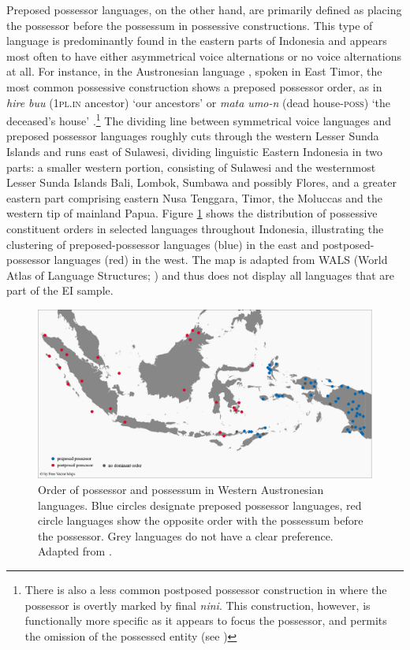 Preposed possessor languages, on the other hand, are primarily defined as placing the possessor before the possessum in possessive constructions. This type of language is predominantly found in the eastern parts of Indonesia and appears most often to have either asymmetrical voice alternations or no voice alternations at all. For instance, in the Austronesian language , spoken in East Timor, the most common possessive construction shows a preposed possessor order, as in \textit{hire buu} (1\textsc{pl}.\textsc{in} ancestor) `our ancestors' or \textit{mata umo-n} (dead house-\textsc{poss}) `the deceased's house' \citep[31]{bowden2006} .\footnote{There is also a less common postposed possessor construction in  where the possessor is overtly marked by final \textit{nini}. This construction, however, is functionally more specific as it appears to focus the possessor, and permits the omission of the possessed entity (see \citealt[32]{bowden2006})} The dividing line between symmetrical voice languages and preposed possessor languages roughly cuts through the western Lesser Sunda Islands and runs east of Sulawesi, dividing linguistic Eastern Indonesia in two parts: a smaller western portion, consisting of Sulawesi and the westernmost Lesser Sunda Islands Bali, Lombok, Sumbawa and possibly Flores, and a greater eastern part comprising eastern Nusa Tenggara, Timor, the Moluccas and the western tip of mainland Papua. Figure \ref{figure:preposed} shows the distribution of possessive constituent orders in selected languages throughout Indonesia, illustrating the clustering of preposed-possessor languages (blue) in the east and postposed-possessor languages (red) in the west. The map is adapted from WALS (World Atlas of Language Structures; \citealt{wals-86}) and thus does not display all languages that are part of the EI sample.

\begin{figure}
\includegraphics[width=\columnwidth]{figures/Preposed_possessor.eps}
\caption[Order of possessor and possessum in Western Austronesian languages]{Order of possessor and possessum in Western Austronesian languages. Blue circles designate preposed possessor languages, red circle languages show the opposite order with the possessum before the possessor. Grey languages do not have a clear preference. Adapted from \citet{wals-86}.}\label{figure:preposed}
\end{figure}

